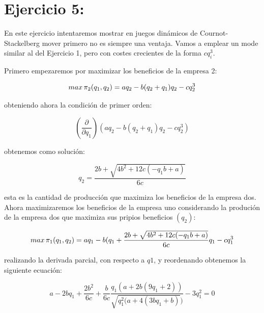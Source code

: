 \documentclass{article}
\begin{document}
\section{Ejercicio 5:}

En este ejercicio intentaremos mostrar en juegos dinámicos de Cournot-Stackelberg mover primero no es siempre una ventaja. Vamos a emplear un mode similar al del Ejercicio 1, pero con costes crecientes de la forma $cq_i^3$.

\vspace{5mm}

Primero empezaremos por maximizar los beneficios de la empresa 2:

$$max\thinspace \pi_2(q_1,q_2)=aq_2-b(q_2+q_1)q_2-cq^3_2$$

obteniendo ahora la condici\'on de primer orden:

$$(\frac{\partial}{\partial q_1})(aq_2-b(q_2+q_1)q_2-cq^3_2)$$

obtenemos como soluci\'on:

$$q_2=\frac{2b+\sqrt{4b^2+12c(-q_1b+a)}}{6c}$$

esta es la cantidad de producci\'on que maximiza los beneficios de la empresa dos. Ahora maximizaremos los beneficios de la empresa uno considerando la produci\'on de la empresa dos que maximiza sus pripios beneficios $(q_2)$:

$$max\thinspace \pi_1(q_1,q_2)=aq_1-b(q_1+\frac{2b+\sqrt{4b^2+12c(-q_1b+a)}}{6c}q_1-cq^3_1$$

realizando la derivada parcial, con respecto a $q1$, y reordenando obtenemos la siguiente ecuación:

$$a-2bq_1+\frac{2b^2}{6c}+\frac{b}{6c}\frac{q_1(a+2b(9q_1+2))}{\sqrt{q_1^2(a+4(3bq_1+b)})}-3q_1^2=0$$
\end{document}
